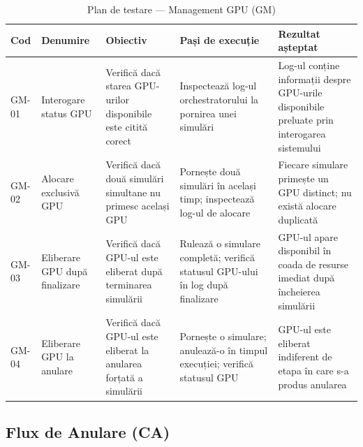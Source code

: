 \documentclass[../../main.tex]{subfiles}
\begin{document}
    \begin{table}[H]
        \centering
        \footnotesize
        \begin{tabular}{|p{}|p{}|p{}|p{}|p{}|}
            \hline
            \textbf{Cod} & \textbf{Denumire} & \textbf{Obiectiv} & \textbf{Pași de execuție} & \textbf{Rezultat așteptat} \\
            \hline
            GM-01 & Interogare status GPU & Verifică dacă starea GPU-urilor disponibile este citită corect & Inspectează log-ul orchestratorului la pornirea unei simulări & Log-ul conține informații despre GPU-urile disponibile preluate prin interogarea sistemului \\
            \hline
            GM-02 & Alocare exclusivă GPU & Verifică dacă două simulări simultane nu primesc același GPU & Pornește două simulări în același timp; inspectează log-ul de alocare & Fiecare simulare primește un GPU distinct; nu există alocare duplicată \\
            \hline
            GM-03 & Eliberare GPU după finalizare & Verifică dacă GPU-ul este eliberat după terminarea simulării & Rulează o simulare completă; verifică statusul GPU-ului în log după finalizare & GPU-ul apare disponibil în coada de resurse imediat după încheierea simulării \\
            \hline
            GM-04 & Eliberare GPU la anulare & Verifică dacă GPU-ul este eliberat la anularea forțată a simulării & Pornește o simulare; anulează-o în timpul execuției; verifică statusul GPU & GPU-ul este eliberat indiferent de etapa în care s-a produs anularea \\
            \hline
        \end{tabular}
        \caption{Plan de testare --- Management GPU (GM)}
        \label{tab:test_gm}
    \end{table}

    \subsection{Flux de Anulare (CA)}
\end{document}
